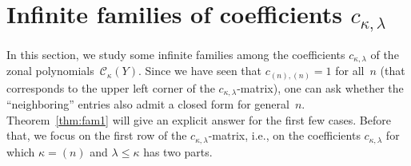 \documentclass{mathincs}
\numberwithin{equation}{section}
\numberwithin{figure}{section}
\theoremstyle{plain}
\theoremstyle{definition}
\theoremstyle{remark}
\theoremstyle{plain}
\theoremstyle{definition}
\theoremstyle{plain}
\theoremstyle{plain}
\begin{document}
\section{Infinite families of coefficients $c_{\kappa,\lambda}$}
\label{sec:families}

In this section, we study some infinite families among the coefficients
$c_{\kappa,\lambda}$ of the zonal polynomials~$\mathcal{C}_{\kappa}(Y)$. Since we have
seen that $c_{(n),(n)}=1$ for all~$n$ (that corresponds to the upper left
corner of the $c_{\kappa,\lambda}$-matrix), one can ask whether the
``neighboring'' entries also admit a closed form for general~$n$.
Theorem~\ref{thm:fam1} will give an explicit answer for the first few cases.
Before that, we focus on the first row of the $c_{\kappa,\lambda}$-matrix,
i.e., on the coefficients $c_{\kappa,\lambda}$ for which
$\kappa=\left(n\right)$ and $\lambda\leq\kappa$ has two parts.
\end{document}
